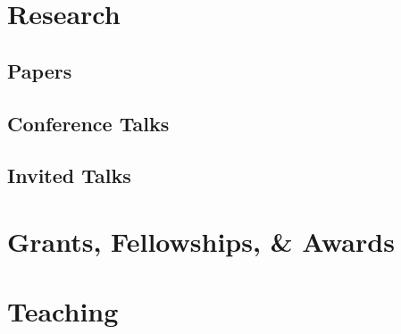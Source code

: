 \documentclass[letterpaper]{article}
\begin{document}
{\unskip}


\section*{Research}
{\unskip}


\subsection*{Papers}
{\unskip}



\subsection*{Conference Talks}

{\unskip}


\subsection*{Invited Talks}

{\unskip}


\section*{Grants, Fellowships, \& Awards}
{\unskip}



\section*{Teaching}
\end{document}
